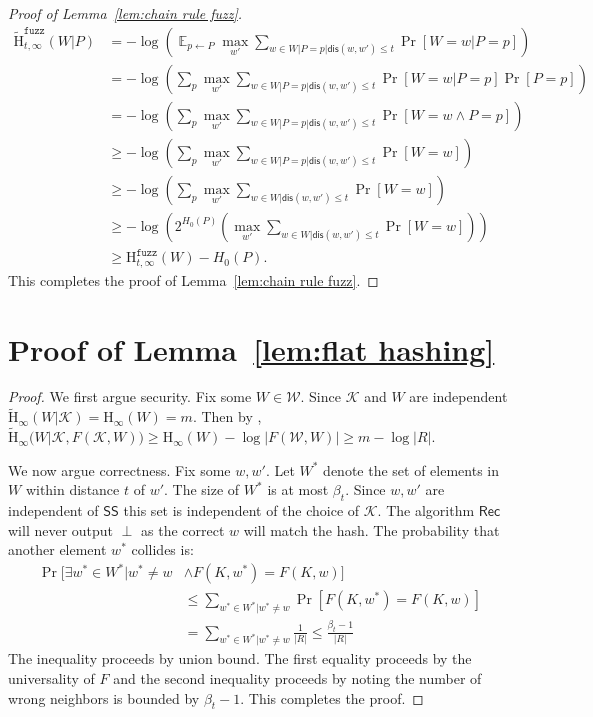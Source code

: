 \documentclass[11pt]{article}
\newcommand{\lemref}[1]{\mbox{Lemma~\ref{#1}}}
\DeclareMathOperator*{\expe}{\mathbb{E}}
\newcommand{\class}[1]{{\ensuremath{\mathsf{#1}}}}
\newcommand{\sketch}{\ensuremath{\class{SS}}\xspace}
\newcommand{\rec}{\ensuremath{\class{Rec}}\xspace}
\newcommand{\dis}{\ensuremath{\mathsf{dis}}}
\newcommand{\Hoo}{\mathrm{H}_\infty}
\newcommand{\Hav}{\tilde{\mathrm{H}}_\infty}
\newcommand{\Hfuzz}{\mathrm{H}^{\mathtt{fuzz}}_{t,\infty}}
\newcommand{\Hfav}{\tilde{\mathrm{H}}^{\mathtt{fuzz}}_{t,\infty}}
\begin{document}
\begin{proof}[Proof of \lemref{lem:chain rule fuzz}]
\begin{align*}
\Hfav(W|P) &= -\log \left( \expe_{p\leftarrow P} \max_{w'} \sum_{w\in W |P =p | \dis(w, w')\le t} \Pr[W=w|P=p] \right)\\
&= -\log \left( \sum_{p} \max_{w'} \sum_{w\in W |P =p | \dis(w, w')\le t} \Pr[W=w|P=p]\Pr[P=p] \right)\\
&= -\log \left( \sum_{p} \max_{w'} \sum_{w\in W |P =p | \dis(w, w')\le t} \Pr[W=w \wedge P=p] \right)\\
&\ge -\log \left( \sum_{p} \max_{w'} \sum_{w\in W |P =p | \dis(w, w')\le t} \Pr[W=w] \right)\\
&\ge -\log \left( \sum_{p} \max_{w'} \sum_{w\in W | \dis(w, w')\le t} \Pr[W=w] \right)\\
&\ge -\log \left( 2^{H_0(P)} \left(\max_{w'} \sum_{w\in W | \dis(w, w')\le t} \Pr[W=w] \right)\right)\\
&\ge \Hfuzz(W) - H_0(P).
\end{align*}
This completes the proof of \lemref{lem:chain rule fuzz}.
\end{proof}



\section{Proof of \lemref{lem:flat hashing}}
\label{sec:proof of flat hashing}
\begin{proof}
We first argue security.  Fix some $W\in\mathcal{W}$. Since $\mathcal{K}$ and $W$ are independent $\Hav(W | \mathcal{K}) = \Hoo(W) = m$.  Then by \cite[Lemma 2.2b]{DBLP:journals/siamcomp/DodisORS08}, $\Hav(W | \mathcal{K}, F(\mathcal{K}, W)) \ge \Hoo(W) - \log |F(\mathcal{W}, W)| \ge m - \log |R|$.

\noindent
We now argue correctness.  Fix some $w, w'$.  Let $W^*$ denote the set of elements in $W$ within distance $t$ of $w'$.  The size of $W^*$ is at most $\beta_{t}$.  Since $w, w'$ are independent of $\sketch$ this set is independent of the choice of $\mathcal{K}$.  The algorithm  $\rec$ will never output $\perp$ as the correct $w$ will match the hash.  The probability that another element $w^*$ collides is:
\begin{align*}
\Pr[\exists w^* \in W^* |w^* \neq w &\wedge F(K, w^*) = F(K, w)] \\&\le \sum_{w^*\in W^* | w^*\neq w} \Pr[F(K, w^*) = F(K, w)] \\
 &= \sum_{w^*\in W^* | w^*\neq w} \frac{1}{|R|} \le \frac{\beta_{t}-1}{|R|}
\end{align*}
The inequality proceeds by union bound. The first equality proceeds by the universality of $F$ and the second inequality proceeds by noting the number of wrong neighbors is bounded by $\beta_{t}-1$.  This completes the proof.
\end{proof}
\end{document}
